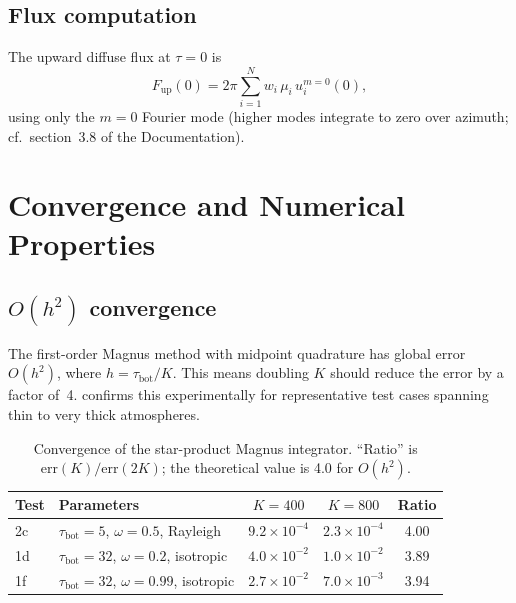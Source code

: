 \documentclass[11pt,a4paper]{article}
\newcommand{\tbot}{\tau_{\mathrm{bot}}}
\theoremstyle{definition}
\begin{document}
\subsection{Flux computation}

The upward diffuse flux at $\tau=0$ is
\begin{equation}
  F_{\text{up}}(0)
  = 2\pi\sum_{i=1}^{N} w_i\,\mu_i\,u^{m=0}_i(0),
\end{equation}
using only the $m\!=\!0$ Fourier mode (higher modes integrate to zero
over azimuth; cf.\ section~3.8 of the Documentation).


\section{Convergence and Numerical Properties}\label{sec:convergence}

\subsection{$O(h^2)$ convergence}

The first-order Magnus method with midpoint quadrature has global error
$O(h^2)$, where $h=\tbot/K$.  This means doubling $K$ should reduce
the error by a factor of~4.   confirms this
experimentally for representative test cases spanning thin to very
thick atmospheres.

\begin{table}[h]\centering
\caption{Convergence of the star-product Magnus integrator.  ``Ratio''
is $\text{err}(K)/\text{err}(2K)$; the theoretical value is 4.0 for
$O(h^2)$.}\label{tab:convergence}
\begin{tabular}{llccc}
\toprule
Test & Parameters
  & $K\!=\!400$ & $K\!=\!800$ & Ratio \\
\midrule
2c & $\tbot\!=\!5$, $\omega\!=\!0.5$, Rayleigh
  & $9.2\times 10^{-4}$ & $2.3\times 10^{-4}$ & 4.00 \\
1d & $\tbot\!=\!32$, $\omega\!=\!0.2$, isotropic
  & $4.0\times 10^{-2}$ & $1.0\times 10^{-2}$ & 3.89 \\
1f & $\tbot\!=\!32$, $\omega\!=\!0.99$, isotropic
  & $2.7\times 10^{-2}$ & $7.0\times 10^{-3}$ & 3.94 \\
\bottomrule
\end{tabular}
\end{table}
\end{document}
